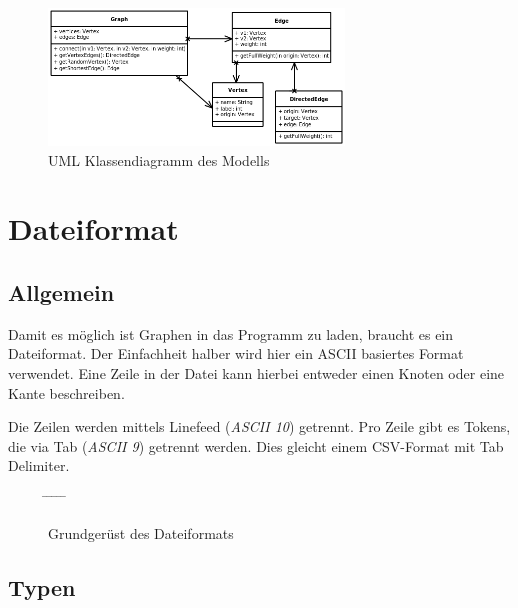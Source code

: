 \documentclass[a4paper,titlepage]{article}
\begin{document}
\begin{figure}[h]
\begin{center}
	\includegraphics[width=0.7\textwidth]{model_diagram2.png}
\end{center}
\caption{UML Klassendiagramm des Modells}
\end{figure}

\newpage

\section{Dateiformat}

\subsection{Allgemein}

Damit es möglich ist Graphen in das Programm zu laden, braucht es ein Dateiformat. Der Einfachheit halber wird hier ein ASCII basiertes Format verwendet. Eine Zeile in der Datei kann hierbei entweder einen Knoten oder eine Kante beschreiben.

Die Zeilen werden mittels Linefeed (\emph{ASCII 10}) getrennt. Pro Zeile gibt es Tokens, die via Tab (\emph{ASCII 9}) getrennt werden. Dies gleicht einem CSV-Format mit Tab Delimiter.

\begin{figure}[hb]
\begin{tabbing}
	\hspace*{3em} \= \hspace{2.7em} \= \hspace{3.7em} \= \hspace{2.7em} \= \hspace{4.8em} \= \kill
	[typ] \>  \> [token] \>  \> [token\_n] \> 
\end{tabbing}
\caption{Grundgerüst des Dateiformats}
\end{figure}

\subsection{Typen}
\end{document}
